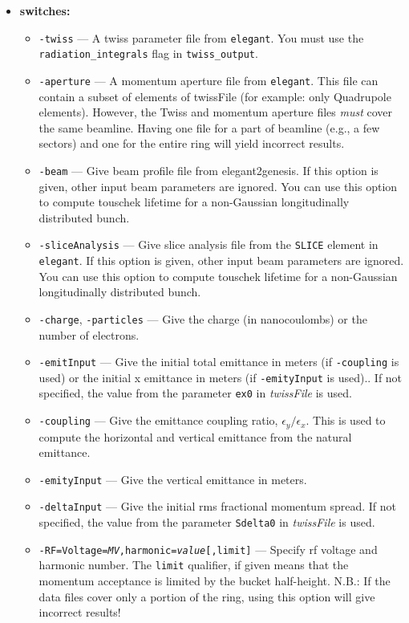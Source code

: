 \documentclass[11pt]{article}
\begin{document}
\begin{itemize}
\item {\bf switches:}
\begin{itemize}
\item {\tt -twiss} --- A twiss parameter file from {\tt elegant}. 
You must use the \verb|radiation_integrals| flag in \verb|twiss_output|.
\item {\tt -aperture} --- A momentum aperture file from {\tt elegant}.
This file can contain a subset of elements of twissFile (for example:
only Quadrupole elements).  However, the Twiss and momentum aperture
files {\em must} cover the same beamline. Having one file for a part
of beamline (e.g., a few sectors) and one for the entire ring will
yield incorrect results.
\item {\tt -beam} --- Give beam profile file from elegant2genesis. If
  this option is given, other input beam parameters are ignored. You
  can use this option to compute touschek lifetime for a non-Gaussian
  longitudinally distributed bunch.
\item {\tt -sliceAnalysis} --- Give slice analysis file from the \verb|SLICE| element in \verb|elegant|.
 If this option is given, other input beam parameters are ignored. You
 can use this option to compute touschek lifetime for a non-Gaussian
 longitudinally distributed bunch.
\item {\tt -charge}, {\tt -particles} --- Give the charge (in nanocoulombs) or the
 number of electrons.
\item {\tt -emitInput} --- Give the initial total emittance in meters (if {\tt -coupling} is used) or
  the initial x emittance in meters (if {\tt -emityInput} is used)..  If not specified,
the value from the parameter \verb|ex0| in {\em twissFile} is used.
\item {\tt -coupling} --- Give the emittance coupling ratio, $\epsilon_y/\epsilon_x$.  This is
 used to compute the horizontal and vertical emittance from the natural emittance.
\item {\tt -emityInput} --- Give the vertical emittance in meters.
\item {\tt -deltaInput} --- Give the initial rms fractional momentum spread.  If not
specified, the value from the parameter \verb|Sdelta0| in {\em twissFile} is used.
\item {\tt -RF=Voltage={\em MV},harmonic={\em value}[,limit]} --- Specify rf voltage and harmonic number.
 The {\tt limit} qualifier, if given means that the momentum acceptance is limited by the bucket
 half-height.
 N.B.: If the data files cover only a portion of the ring, using this option will give incorrect results!

\end{itemize}
\end{itemize}
\end{document}
